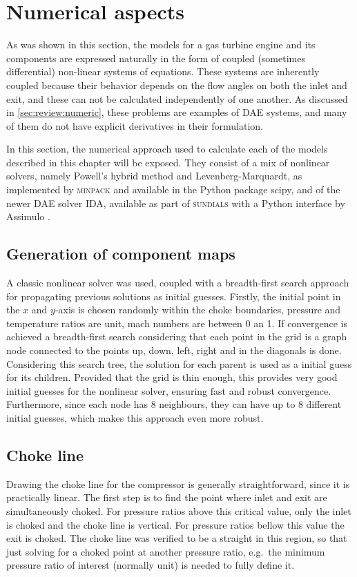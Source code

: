 \section{Numerical aspects}

As was shown in this section, the models for a gas turbine engine and its components are expressed naturally in the form of coupled (sometimes differential) non-linear systems of equations. 
These systems are inherently coupled because their behavior depends on the flow angles on both the inlet and exit, and these can not be calculated independently of one another.
As discussed in \cref{sec:review:numeric}, these problems are examples of \ac{DAE} systems, and many of them do not have explicit derivatives in their formulation.

In this section, the numerical approach used to calculate each of the models described in this chapter will be exposed. They consist of a mix of nonlinear solvers, namely Powell's hybrid method and Levenberg-Marquardt, as implemented by \textsc{minpack} and available in the Python package scipy, and of the newer \ac{DAE} solver \textsc{IDA}, available as part of \textsc{sundials} \cite{sundials} with a Python interface by Assimulo \cite{assimulo}.

\subsection{Generation of component maps}
A classic nonlinear solver was used, coupled with a breadth-first search approach for propagating previous solutions as initial guesses. 
Firstly, the initial point in the $x$ and $y$-axis is chosen randomly within the choke boundaries, 
pressure and temperature ratios are unit, mach numbers are between 0 an 1. 
If convergence is achieved a breadth-first search considering that each point in the grid is a graph node connected to the points up, down, left, right and in the diagonals is done.
Considering this search tree, the solution for each parent is used as a initial guess for its children. Provided that the grid is thin enough, this provides very good initial guesses for the nonlinear solver, ensuring fast and robust convergence. Furthermore, since each node has 8 neighbours, they can have up to 8 different initial guesses, which makes this approach even more robust.

\subsection{Choke line}
Drawing the choke line for the compressor is generally straightforward, since it is practically linear. The first step is to find the point where inlet and exit are simultaneously choked. For pressure ratios above this critical value, only the inlet is choked and the choke line is vertical. For pressure ratios bellow this value the exit is choked. The choke line was verified to be a straight in this region, so that just solving for a choked point at another pressure ratio, e.g.\ the minimum pressure ratio of interest (normally unit) is needed to fully define it.



